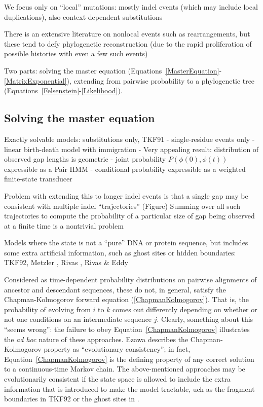 \documentclass{bmcart}
\newcommand{\eqref}[1]{Equation~\ref{#1}}
\begin{document}
We focus only on ``local'' mutations: mostly indel events (which may include local duplications),
also context-dependent substitutions

There is an extensive literature on nonlocal events such as rearrangements,
but these tend to defy phylogenetic reconstruction (due to the rapid proliferation of possible histories with even a few such events)

Two parts:
solving the master equation (Equations~\ref{MasterEquation}-\ref{MatrixExponential}),
extending from pairwise probability to a phylogenetic tree (Equations~\ref{Felsenstein}-\ref{Likelihood}).

\subsection*{Solving the master equation}

Exactly solvable models:
substitutions only,
TKF91
 - single-residue events only
 - linear birth-death model with immigration
 - Very appealing result: distribution of observed gap lengths is geometric
 - joint probability $P(\phi(0),\phi(t))$ expressible as a Pair HMM \cite{HolmesBruno2001}
 - conditional probability expressible as a weighted finite-state transducer \cite{Holmes2003,Westesson2012-zg,BouchardCote2013}

Problem with extending this to longer indel events is that a single gap may be consistent with
multiple indel ``trajectories'' (Figure)
Summing over all such trajectories to compute the probability of a particular size of gap being observed at a finite time
is a nontrivial problem

Models where the state is not a ``pure'' DNA or protein sequence,
but includes some extra artificial information,
such as ghost sites or hidden boundaries:
TKF92,
Metzler \cite{Metzler2003},
Rivas \cite{Rivas05},
Rivas \& Eddy \cite{RivasEddy2008,RivasEddy2015}

Considered as time-dependent probability distributions on pairwise alignments of
ancestor and descendant sequences,
these do not, in general, satisfy the Chapman-Kolmogorov forward equation
(\ref{ChapmanKolmogorov}).
That is, the probability of evolving from $i$ to $k$ comes out differently
depending on whether or not one conditions on an intermediate sequence $j$.
Clearly, something about this ``seems wrong'':
the failure to obey \eqref{ChapmanKolmogorov} illustrates the {\em ad hoc}
nature of these approaches.
Ezawa \cite{Ezawa2016b} describes the Chapman-Kolmogorov property as ``evolutionary consistency'';
in fact, \eqref{ChapmanKolmogorov} is the defining property
of any correct solution to a continuous-time Markov chain.
The above-mentioned approaches may be evolutionarily consistent if the state space
is allowed to include the extra information that is introduced to make the model tractable,
uch as the fragment boundaries in TKF92
or the ghost sites in \cite{RivasEddy2015}.
\end{document}

